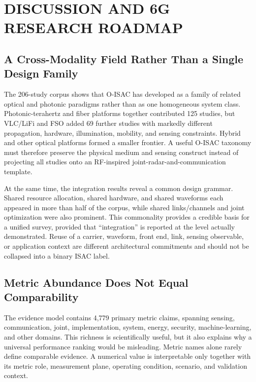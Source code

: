 \section{DISCUSSION AND 6G RESEARCH ROADMAP}
\label{sec:discussion_roadmap}

\subsection{A Cross-Modality Field Rather Than a Single Design Family}

The 206-study corpus shows that O-ISAC has developed as a family of related
optical and photonic paradigms rather than as one homogeneous system class.
Photonic-terahertz and fiber platforms together contributed 125 studies, but
VLC/LiFi and FSO added 69 further studies with markedly different propagation,
hardware, illumination, mobility, and sensing constraints. Hybrid and other
optical platforms formed a smaller frontier. A useful O-ISAC taxonomy must
therefore preserve the physical medium and sensing construct instead of
projecting all studies onto an RF-inspired joint-radar-and-communication
template.

At the same time, the integration results reveal a common design grammar.
Shared resource allocation, shared hardware, and shared waveforms each
appeared in more than half of the corpus, while shared links/channels and joint
optimization were also prominent. This commonality provides a credible basis
for a unified survey, provided that ``integration'' is reported at the level
actually demonstrated. Reuse of a carrier, waveform, front end, link, sensing
observable, or application context are different architectural commitments
and should not be collapsed into a binary ISAC label.

\subsection{Metric Abundance Does Not Equal Comparability}

The evidence model contains 4,779 primary metric claims, spanning sensing,
communication, joint, implementation, system, energy, security,
machine-learning, and other domains. This richness is scientifically useful,
but it also explains why a universal performance ranking would be misleading.
Metric names alone rarely define comparable evidence. A numerical value is
interpretable only together with its metric role, measurement plane, operating
condition, scenario, and validation context.

